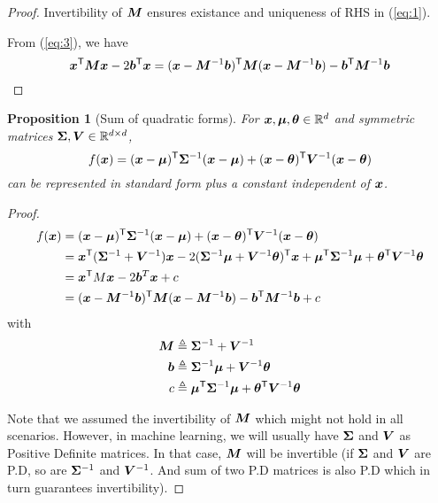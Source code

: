 \documentclass{article}
\newtheorem{proposition}{Proposition}
\begin{document}
\begin{proof}
    Invertibility of ${\bm{M}}$ ensures existance and uniqueness of RHS in (\ref{eq:1}).

    From (\ref{eq:3}), we have
    \[
        {\bm{x}}^{\mathsf{T}}{\bm{M}}{\bm{x}} - 2{\bm{b}}^{\mathsf{T}}{\bm{x}} = ({\bm{x}} - {\bm{M}}^{-1}{\bm{b}})^{\mathsf{T}} {\bm{M}} ({\bm{x}} - {\bm{M}}^{-1}{\bm{b}}) - {\bm{b}}^{\mathsf{T}}{\bm{M}}^{-1}{\bm{b}}
    \]
\end{proof}

\begin{proposition}[Sum of quadratic forms]
    For ${\bm{x}}, {\bm{\mu}}, {\bm{\theta}} \in \mathbb{R}^d$ and symmetric matrices ${\bm{\Sigma}}, {\bm{V}} \in \mathbb{R}^{d \times d}$,   
    \[
        f({\bm{x}}) = ({\bm{x}} - {\bm{\mu}})^{\mathsf{T}}{\bm{\Sigma}}^{-1}({\bm{x}} - {\bm{\mu}}) + ({\bm{x}} - {\bm{\theta}})^{\mathsf{T}}{\bm{V}}^{-1}({\bm{x}} - {\bm{\theta}})
    \]
    can be represented in standard form plus a constant independent of ${\bm{x}}$.
\end{proposition}

\begin{proof}
    \begin{equation*}
        \begin{split}
            f({\bm{x}}) &= ({\bm{x}} - {\bm{\mu}})^{\mathsf{T}}{\bm{\Sigma}}^{-1}({\bm{x}} - {\bm{\mu}}) + ({\bm{x}} - {\bm{\theta}})^{\mathsf{T}}{\bm{V}}^{-1}({\bm{x}} - {\bm{\theta}}) \\
                   &= {\bm{x}}^{\mathsf{T}} ({\bm{\Sigma}}^{-1} + {\bm{V}}^{-1}) {\bm{x}} - 2 ({\bm{\Sigma}}^{-1} {\bm{\mu}} + {\bm{V}}^{-1} {\bm{\theta}})^{\mathsf{T}} {\bm{x}} + {\bm{\mu}}^{\mathsf{T}}{\bm{\Sigma}}^{-1}{\bm{\mu}} + {\bm{\theta}}^{\mathsf{T}}{\bm{V}}^{-1}{\bm{\theta}} \\
                   &= {\bm{x}}^{\mathsf{T}} M {\bm{x}} -2{\bm{b}}^T{\bm{x}} + c \\
                   &= ({\bm{x}} - {\bm{M}}^{-1}{\bm{b}})^{\mathsf{T}} {\bm{M}} ({\bm{x}} - {\bm{M}}^{-1}{\bm{b}}) - {\bm{b}}^{\mathsf{T}}{\bm{M}}^{-1}{\bm{b}} + c \\
        \end{split}    
    \end{equation*}    
    with
    \begin{equation*}
        \begin{split}
            {\bm{M}} &\triangleq {\bm{\Sigma}}^{-1} + {\bm{V}}^{-1} \\
            {\bm{b}} &\triangleq {\bm{\Sigma}}^{-1} {\bm{\mu}} + {\bm{V}}^{-1} {\bm{\theta}} \\
            c &\triangleq {\bm{\mu}}^{\mathsf{T}}{\bm{\Sigma}}^{-1}{\bm{\mu}} + {\bm{\theta}}^{\mathsf{T}}{\bm{V}}^{-1}{\bm{\theta}}
        \end{split}
    \end{equation*}

    Note that we assumed the invertibility of ${\bm{M}}$ which might not hold in all scenarios. However, in machine learning, we will usually have ${\bm{\Sigma}}$ and ${\bm{V}}$
    as Positive Definite matrices. In that case, ${\bm{M}}$ will be invertible (if ${\bm{\Sigma}}$ and ${\bm{V}}$ are P.D, so are ${\bm{\Sigma}}^{-1}$ and ${\bm{V}}^{-1}$. And sum of two P.D matrices is also P.D which in turn guarantees
    invertibility).
\end{proof}
\end{document}
